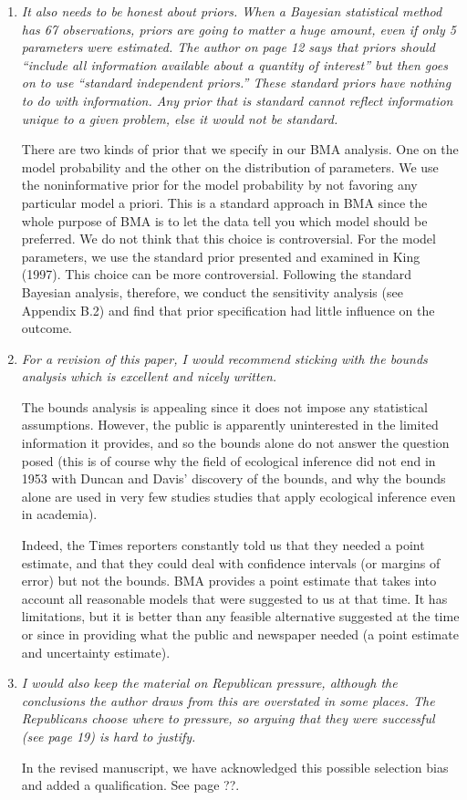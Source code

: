 \documentclass[11pt]{article}
\begin{document}
\begin{enumerate}
\item {\it It also needs to be honest about priors.  When a Bayesian
    statistical method has 67 observations, priors are going to matter
    a huge amount, even if only 5 parameters were estimated.  The
    author on page 12 says that priors should ``include all
    information available about a quantity of interest'' but then goes
    on to use ``standard independent priors.'' These standard priors
    have nothing to do with information.  Any prior that is standard
    cannot reflect information unique to a given problem, else it
    would not be standard.}
  
  There are two kinds of prior that we specify in our BMA analysis.
  One on the model probability and the other on the distribution of
  parameters. We use the noninformative prior for the model
  probability by not favoring any particular model a priori. This is a
  standard approach in BMA since the whole purpose of BMA is to let
  the data tell you which model should be preferred. We do not think
  that this choice is controversial. For the model parameters, we use
  the standard prior presented and examined in King (1997). This
  choice can be more controversial. Following the standard Bayesian
  analysis, therefore, we conduct the sensitivity analysis (see
  Appendix B.2) and find that prior specification had little influence
  on the outcome.
  
\item {\it For a revision of this paper, I would recommend sticking
    with the bounds analysis which is excellent and nicely written.}
  
  The bounds analysis is appealing since it does not impose any
  statistical assumptions.  However, the public is apparently
  uninterested in the limited information it provides, and so the
  bounds alone do not answer the question posed (this is of course why
  the field of ecological inference did not end in 1953 with Duncan
  and Davis' discovery of the bounds, and why the bounds alone are
  used in very few studies studies that apply ecological inference
  even in academia).  
  
  Indeed, the Times reporters constantly told us that they needed a
  point estimate, and that they could deal with confidence intervals
  (or margins of error) but not the bounds.  BMA provides a point
  estimate that takes into account all reasonable models that were
  suggested to us at that time.  It has limitations, but it is better
  than any feasible alternative suggested at the time or since in
  providing what the public and newspaper needed (a point estimate and
  uncertainty estimate). 
 
\item {\it I would also keep the material on Republican pressure,
    although the conclusions the author draws from this are overstated
    in some places.  The Republicans choose where to pressure, so
    arguing that they were successful (see page 19) is hard to
    justify.}
  
  In the revised manuscript, we have acknowledged this possible
  selection bias and added a qualification. See page ??.


\end{enumerate}
\end{document}
